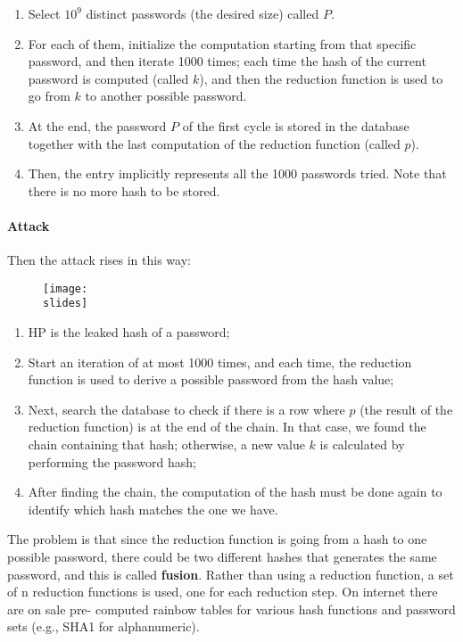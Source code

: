 \begin{enumerate}
  \item Select $10^9$ distinct passwords (the desired size) called $P$.
  \item For each of them, initialize the computation starting from that specific password, and then iterate 1000 times; each time the hash of the current password is computed (called $k$), and then the reduction function is used to go from $k$ to another possible password.
  \item At the end, the password $P$ of the first cycle is stored in the database together with the last computation of the reduction function (called $p$).
  \item Then, the entry implicitly represents all the 1000 passwords tried. Note that there is no more hash to be stored.
\end{enumerate}


\paragraph{Attack}
Then the attack rises in this way:
\begin{figure}[h]
  \centering
  \texttt{[image: \\slides]}
\end{figure}

\begin{enumerate}
  \item $\mathrm{HP}$ is the leaked hash of a password;
  \item Start an iteration of at most 1000 times, and each time, the reduction function is used to derive a possible password from the hash value;
  \item Next, search the database to check if there is a row where $p$ (the result of the reduction function) is at the end of the chain. In that case, we found the chain containing that hash; otherwise, a new value $k$ is calculated by performing the password hash;
  \item After finding the chain, the computation of the hash must be done again to identify which hash matches the one we have.
\end{enumerate}

The problem is that since the reduction function is going from a hash to one possible password, there could be
two different hashes that generates the same password, and this is called \textbf{fusion}. Rather than using a reduction
function, a set of n reduction functions is used, one for each reduction step. On internet there are on sale pre-
computed rainbow tables for various hash functions and password sets (e.g., SHA1 for alphanumeric).


